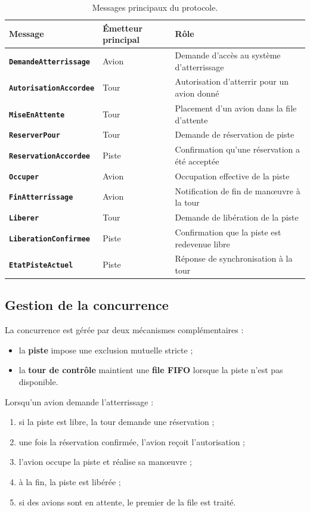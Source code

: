 \documentclass[11pt,a4paper]{article}
\begin{document}
\begin{table}[H]
\centering
\caption{Messages principaux du protocole.}
\begin{tabularx}{\textwidth}{>{\bfseries}p{4.2cm} Y Y}
\toprule
Message & Émetteur principal & Rôle \\
\midrule
\texttt{DemandeAtterrissage} & Avion & Demande d'accès au système d'atterrissage \\
\texttt{AutorisationAccordee} & Tour & Autorisation d'atterrir pour un avion donné \\
\texttt{MiseEnAttente} & Tour & Placement d'un avion dans la file d'attente \\
\texttt{ReserverPour} & Tour & Demande de réservation de piste \\
\texttt{ReservationAccordee} & Piste & Confirmation qu'une réservation a été acceptée \\
\texttt{Occuper} & Avion & Occupation effective de la piste \\
\texttt{FinAtterrissage} & Avion & Notification de fin de manœuvre à la tour \\
\texttt{Liberer} & Tour & Demande de libération de la piste \\
\texttt{LiberationConfirmee} & Piste & Confirmation que la piste est redevenue libre \\
\texttt{EtatPisteActuel} & Piste & Réponse de synchronisation à la tour \\
\bottomrule
\end{tabularx}
\end{table}

\subsection{Gestion de la concurrence}

La concurrence est gérée par deux mécanismes complémentaires :
\begin{itemize}
    \item la \textbf{piste} impose une exclusion mutuelle stricte ;
    \item la \textbf{tour de contrôle} maintient une \textbf{file FIFO} lorsque la piste n'est pas disponible.
\end{itemize}

Lorsqu'un avion demande l'atterrissage :
\begin{enumerate}
    \item si la piste est libre, la tour demande une réservation ;
    \item une fois la réservation confirmée, l'avion reçoit l'autorisation ;
    \item l'avion occupe la piste et réalise sa manœuvre ;
    \item à la fin, la piste est libérée ;
    \item si des avions sont en attente, le premier de la file est traité.
\end{enumerate}
\end{document}
